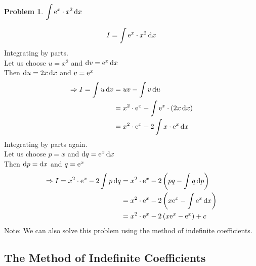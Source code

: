 \documentclass[14]{article}
\theoremstyle{definition}
\newtheorem{prob}{Problem}
\theoremstyle{case}
\begin{document}
\begin{prob}
$\displaystyle \int {\rm e}^x \cdot x^2 \dif x$
\end{prob}
\[I = \int {\rm e}^x \cdot x^2 \dif x\]
Integrating by parts.\\
Let us choose $u = x^2$ and $\dif v = {\rm e}^x \dif x$\\
Then $\dif u = 2x \dif x$ and $v = {\rm e}^x$\\
\begin{align*}
\Rightarrow I = \int u \dif v &= uv - \int v \dif u\\
&= x^2 \cdot {\rm e}^x - \int {\rm e}^x \cdot (2x \dif x)\\
&= x^2 \cdot {\rm e}^x - 2 \int x \cdot {\rm e}^x \dif x
\end{align*}
Integrating by parts again.\\
Let us choose $p = x$ and $\dif q = {\rm e}^x \dif x$\\
Then $\dif p = \dif x$ and $q = {\rm e}^x$
\begin{align*}
\Rightarrow I = x^2 \cdot {\rm e}^x - 2 \int p \dif q &= x^2 \cdot {\rm e}^x - 2 \left( pq - \int q \dif p \right)\\
&= x^2 \cdot {\rm e}^x - 2 \left( x {\rm e}^x - \int {\rm e}^x \dif x \right)\\
&= x^2 \cdot {\rm e}^x - 2 \left( x {\rm e}^x - {\rm e}^x \right) + c
\end{align*}
Note: We can also solve this problem using the method of indefinite coefficients.
\pagebreak
\subsection{The Method of Indefinite Coefficients}
\end{document}
